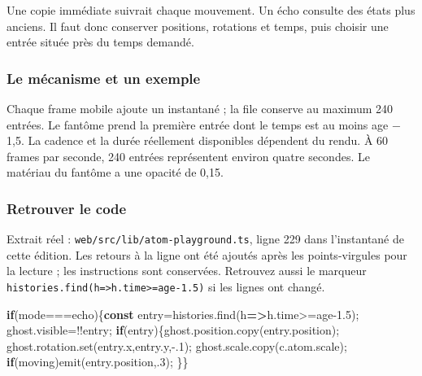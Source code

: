 \documentclass[
  canadien,
  11pt,
  letterpaper,
]{article}
\newenvironment{Shaded}{}{}
\newcommand{\AttributeTok}[1]{\textcolor[rgb]{0.49,0.56,0.16}{#1}}
\newcommand{\ControlFlowTok}[1]{\textcolor[rgb]{0.00,0.44,0.13}{\textbf{#1}}}
\newcommand{\DecValTok}[1]{\textcolor[rgb]{0.25,0.63,0.44}{#1}}
\newcommand{\FloatTok}[1]{\textcolor[rgb]{0.25,0.63,0.44}{#1}}
\newcommand{\FunctionTok}[1]{\textcolor[rgb]{0.02,0.16,0.49}{#1}}
\newcommand{\KeywordTok}[1]{\textcolor[rgb]{0.00,0.44,0.13}{\textbf{#1}}}
\newcommand{\NormalTok}[1]{#1}
\newcommand{\OperatorTok}[1]{\textcolor[rgb]{0.40,0.40,0.40}{#1}}
\newcommand{\StringTok}[1]{\textcolor[rgb]{0.25,0.44,0.63}{#1}}
\begin{document}
Une copie immédiate suivrait chaque mouvement. Un écho consulte des
états plus anciens. Il faut donc conserver positions, rotations et
temps, puis choisir une entrée située près du temps demandé.

\subsubsection{Le mécanisme et un
exemple}\label{le-muxe9canisme-et-un-exemple-11}

Chaque frame mobile ajoute un instantané ; la file conserve au maximum
240 entrées. Le fantôme prend la première entrée dont le temps est au
moins age − 1,5. La cadence et la durée réellement disponibles dépendent
du rendu. À 60 frames par seconde, 240 entrées représentent environ
quatre secondes. Le matériau du fantôme a une opacité de 0,15.

\subsubsection{Retrouver le code}\label{retrouver-le-code-11}

Extrait réel : \texttt{web/src/lib/atom-playground.ts}, ligne 229 dans
l'instantané de cette édition. Les retours à la ligne ont été ajoutés
après les points-virgules pour la lecture ; les instructions sont
conservées. Retrouvez aussi le marqueur
\texttt{histories.find(h=\textgreater{}h.time\textgreater{}=age-1.5)} si
les lignes ont changé.

\begin{Shaded}
\begin{Highlighting}[]
\ControlFlowTok{if}\NormalTok{(mode}\OperatorTok{===}\StringTok{\textquotesingle{}echo\textquotesingle{}}\NormalTok{)\{}\KeywordTok{const}\NormalTok{ entry}\OperatorTok{=}\NormalTok{histories}\OperatorTok{.}\FunctionTok{find}\NormalTok{(h}\KeywordTok{=\textgreater{}}\NormalTok{h}\OperatorTok{.}\AttributeTok{time}\OperatorTok{\textgreater{}=}\NormalTok{age}\OperatorTok{{-}}\FloatTok{1.5}\NormalTok{)}\OperatorTok{;}
\NormalTok{ghost}\OperatorTok{.}\AttributeTok{visible}\OperatorTok{=!!}\NormalTok{entry}\OperatorTok{;}
\ControlFlowTok{if}\NormalTok{(entry)\{ghost}\OperatorTok{.}\AttributeTok{position}\OperatorTok{.}\FunctionTok{copy}\NormalTok{(entry}\OperatorTok{.}\AttributeTok{position}\NormalTok{)}\OperatorTok{;}
\NormalTok{ghost}\OperatorTok{.}\AttributeTok{rotation}\OperatorTok{.}\FunctionTok{set}\NormalTok{(entry}\OperatorTok{.}\AttributeTok{x}\OperatorTok{,}\NormalTok{entry}\OperatorTok{.}\AttributeTok{y}\OperatorTok{,{-}.}\DecValTok{1}\NormalTok{)}\OperatorTok{;}
\NormalTok{ghost}\OperatorTok{.}\AttributeTok{scale}\OperatorTok{.}\FunctionTok{copy}\NormalTok{(c}\OperatorTok{.}\AttributeTok{atom}\OperatorTok{.}\AttributeTok{scale}\NormalTok{)}\OperatorTok{;}
\ControlFlowTok{if}\NormalTok{(moving)}\FunctionTok{emit}\NormalTok{(entry}\OperatorTok{.}\AttributeTok{position}\OperatorTok{,.}\DecValTok{3}\NormalTok{)}\OperatorTok{;}
\NormalTok{\}\}}
\end{Highlighting}
\end{Shaded}
\end{document}
